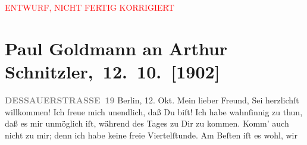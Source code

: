 
\begin{center}
            \textcolor{red}{ENTWURF, NICHT FERTIG KORRIGIERT}
                      \end{center}
            
         
         \renewcommand{\erwaehntePersonen}{Personen: August Strindberg}
         \renewcommand{\erwaehnteInstitutionen}{Institutionen: Schall und Rauch}
         \renewcommand{\erwaehnteOrte}{Orte: Berlin, Breslau, Dessauer Straße, Schall und Rauch, Wien}
         \renewcommand{\erwaehnteWerke}{Werke: Rausch}
               \section[ Paul Goldmann an Arthur Schnitzler, 12. 10. {[}1902{]}]{ Paul Goldmann an Arthur Schnitzler, 12. 10. {[}1902{]}}\nopagebreak{}\rehead{ }\begin{ledgroupsized}[t]{13cm}\normalsize\beginnumbering \toendnotes[C]{\smallbreak\pagebreak[2]} 
\toendnotes[C]{\smallbreak}\pstart
           \noindent{}\raggedleft{}{\pb}\textcolor{gray}{\textbf{DESSAUERSTRASSE 19}}\pend
           \pstart
           Berlin, 12.
                  Okt.\pend
           \pstart\center{}Mein lieber Freund,\pend\pstart
           Sei herzlichſt willkommen! Ich freue mich unendlich, daß Du \label{K_L03226-1v}\label{K_L03226-1h}
               biſt!\pend
           \pstart
           Ich habe wahnſinnig zu thun, daß es mir unmöglich iſt, während des Tages zu Dir zu
               kommen. Komm’ auch nicht zu mir; denn ich habe keine freie Viertelſtunde. Am Beſten
               iſt es wohl, wir \label{K_L03226-2v}
\end{ledgroupsized}
